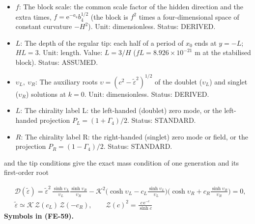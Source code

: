 \documentclass[
  10pt,
]{article}
\begin{document}
\begin{itemize}
  mass); \(\varepsilon_o\) the Kohn-Sham level of the orbital \(o\).
  Unit: GeV. Status: DERIVED.
\item
  \(f\): The block scale: the common scale factor of the hidden
  direction and the extra times, \(f = \mathrm{e}^{-a_4}b_4^{1/2}\) (the
  block is \(f^2\) times a four-dimensional space of constant curvature
  \(-H^2\)). Unit: dimensionless. Status: DERIVED.
\item
  \(L\): The depth of the regular tip: each half of a period of \(x_0\)
  ends at \(y = -L\); \(HL = 3\). Unit: length. Value: \(L = 3/H\)
  (\(fL = 8.926\times10^{-21}\) m at the stabilised block). Status:
  ASSUMED.
\item
  \(\upsilon_L,\ \upsilon_R\): The auxiliary roots
  \(\upsilon = (c^2 - \tilde\varepsilon^2)^{1/2}\) of the doublet
  (\(\upsilon_L\)) and singlet (\(\upsilon_R\)) solutions at \(k = 0\).
  Unit: dimensionless. Status: DERIVED.
\item
  \(L\): The chirality label L: the left-handed (doublet) zero mode, or
  the left-handed projection \(P_L = (1 + \Gamma_4)/2\). Status:
  STANDARD.
\item
  \(R\): The chirality label R: the right-handed (singlet) zero mode or
  field, or the projection \(P_R = (1 - \Gamma_4)/2\). Status: STANDARD.
\end{itemize}

and the tip conditions give the exact mass condition of one generation
and its first-order root

\[
\begin{aligned}
&\mathcal{D}(\tilde\varepsilon) =
 \tilde\varepsilon^2\,\frac{\sinh\upsilon_L}{\upsilon_L}\frac{\sinh\upsilon_R}{\upsilon_R}
 - \mathcal{K}^2\Big(\cosh\upsilon_L - c_L\frac{\sinh\upsilon_L}{\upsilon_L}\Big)
 \Big(\cosh\upsilon_R + c_R\frac{\sinh\upsilon_R}{\upsilon_R}\Big) = 0,\\
&\tilde\varepsilon \simeq \mathcal{K}\,\mathcal{Z}(c_L)\,\mathcal{Z}(-c_R),\qquad \mathcal{Z}(c)^2 =
 \frac{c\,\mathrm{e}^{-c}}{\sinh c}
\end{aligned} \tag{FE-59}
\] \textbf{Symbols in (FE-59).}
\end{document}
